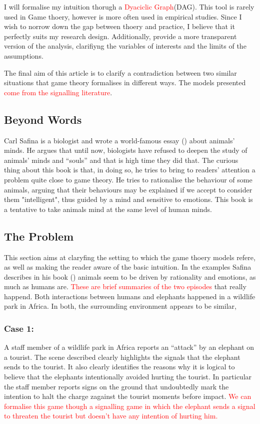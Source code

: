 I will formalise my intuition thorugh a \textcolor{red}{Dyaciclic Graph}(DAG). This tool is rarely used in Game thoery, however is more often used in empirical studies. Since I wish to norrow down the gap between thoery and practice, I believe that it perfectly suits my research design. Additionally, provide a more transparent version of the analysis, clarifiyng the variables of interests and the limits of the assumptions.

The final aim of this article is to clarify a contradiction between two similar situations that game theory formalises in different ways. The models presented \textcolor{red}{come from the signalling literature}.

\subsection*{Beyond Words}

\vspace{1em}
Carl Safina is a biologist and wrote a world-famous essay (\cite{safinaWordsWhatAnimals2015}) about animals' minds. He argues that until now, biologists have refused to deepen the study of animals' minds and “souls” and that is high time they did that. The curious thing about this book is that, in doing so, he tries to bring to readers' attention a problem quite close to game theory.
He tries to rationalise the behaviour of some animals, arguing that their behaviours may be explained if we accept to consider them "intelligent", thus guided by a mind and sensitive to emotions. This book is a tentative to take animals mind at the same level of human minds.

\subsection*{The Problem}
This section aims at claryfing the setting to which the game thoery models refere, as well as making the reader aware of the basic intuition.
In the examples Safina describes in his book (\cite{safinaWordsWhatAnimals2015}) animals seem to be driven by rationality and emotions, as much as humans are. 
\textcolor{red}{These are brief summaries of the two episodes} that really happend.
Both interactions between humans and elephants happened in a wildlife park in Africa. In both, the surrounding environment appears to be similar, 

\subsubsection*{Case 1:}
A staff member of a wildlife park in Africa reports an “attack” by an elephant on a tourist. The scene described clearly highlights the signals that the elephant sends to the tourist. It also clearly identifies the reasons why it is logical to believe that the elephants intentionally avoided hurting the tourist.
In particular the staff member reports signs on the ground that undoubtedly mark the intention to halt the charge zagainst the tourist moments before impact.
\textcolor{red}{We can formalise this game though a signalling game in which the elephant sends a signal to threaten the tourist but doesn’t have any intention of hurting him.}

